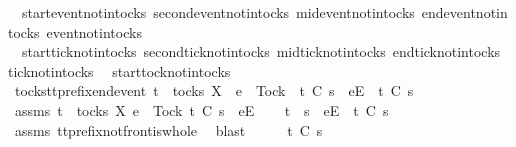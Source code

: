 \ \ start{\isacharunderscore}event{\isacharunderscore}notin{\isacharunderscore}tocks\ second{\isacharunderscore}event{\isacharunderscore}notin{\isacharunderscore}tocks\ mid{\isacharunderscore}event{\isacharunderscore}notin{\isacharunderscore}tocks\ end{\isacharunderscore}event{\isacharunderscore}notin{\isacharunderscore}tocks\ event{\isacharunderscore}notin{\isacharunderscore}tocks\isanewline
\ \ start{\isacharunderscore}tick{\isacharunderscore}notin{\isacharunderscore}tocks\ second{\isacharunderscore}tick{\isacharunderscore}notin{\isacharunderscore}tocks\ mid{\isacharunderscore}tick{\isacharunderscore}notin{\isacharunderscore}tocks\ end{\isacharunderscore}tick{\isacharunderscore}notin{\isacharunderscore}tocks\ tick{\isacharunderscore}notin{\isacharunderscore}tocks\isanewline
\ \ start{\isacharunderscore}tock{\isacharunderscore}notin{\isacharunderscore}tocks\isanewline
\isanewline
{}\isamarkupfalse%
\ tocks{\isacharunderscore}tt{\isacharunderscore}prefix{\isacharunderscore}end{\isacharunderscore}event{\isacharcolon}\ {\isachardoublequoteopen}t\ {\isasymin}\ tocks\ X\ {\isasymLongrightarrow}\ e\ {\isasymnoteq}\ Tock\ {\isasymLongrightarrow}\ t\ {\isasymle}\isactrlsub C\ s\ {\isacharat}\ {\isacharbrackleft}{\isacharbrackleft}e{\isacharbrackright}\isactrlsub E{\isacharbrackright}\ {\isasymLongrightarrow}\ t\ {\isasymle}\isactrlsub C\ s{\isachardoublequoteclose}\isanewline
%
\isadelimproof
%
\endisadelimproof
%
\isatagproof
{}\isamarkupfalse%
\ {\isacharminus}\isanewline
\ \ \isamarkupfalse%
\ assms{\isacharcolon}\ {\isachardoublequoteopen}t\ {\isasymin}\ tocks\ X{\isachardoublequoteclose}\ {\isachardoublequoteopen}e\ {\isasymnoteq}\ Tock{\isachardoublequoteclose}\ {\isachardoublequoteopen}t\ {\isasymle}\isactrlsub C\ s\ {\isacharat}\ {\isacharbrackleft}{\isacharbrackleft}e{\isacharbrackright}\isactrlsub E{\isacharbrackright}{\isachardoublequoteclose}\isanewline
\ \ \isamarkupfalse%
\ {\isachardoublequoteopen}t\ {\isacharequal}\ s\ {\isacharat}\ {\isacharbrackleft}{\isacharbrackleft}e{\isacharbrackright}\isactrlsub E{\isacharbrackright}\ {\isasymor}\ t\ {\isasymle}\isactrlsub C\ s{\isachardoublequoteclose}\isanewline
\ \ \ \ \isamarkupfalse%
\ assms{\isacharparenleft}{}{\isacharparenright}\ tt{\isacharunderscore}prefix{\isacharunderscore}notfront{\isacharunderscore}is{\isacharunderscore}whole\ \isamarkupfalse%
\ blast\isanewline
\ \ \isamarkupfalse%
\ \isamarkupfalse%
\ {\isachardoublequoteopen}t\ {\isasymle}\isactrlsub C\ s{\isachardoublequoteclose}\isanewline
